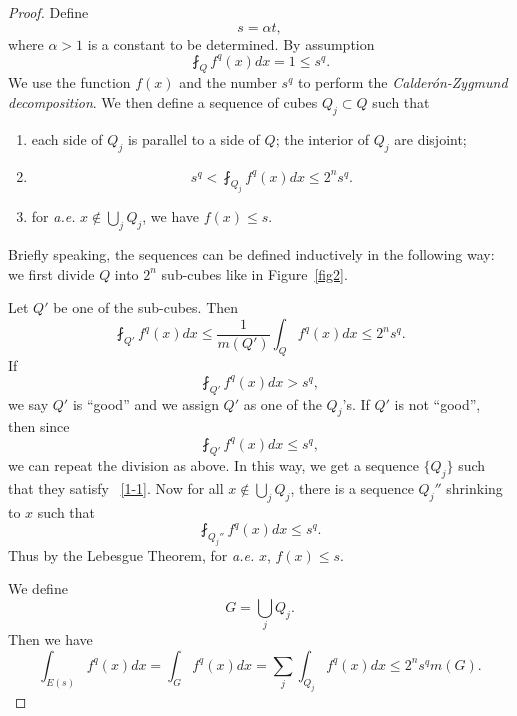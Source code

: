 \begin{proof}
Define
\[
s=\alpha t,
\]
where $\alpha>1$ is a constant to be determined. By assumption
\[
\fint_Q f^q(x) dx=1\leq s^q.
\]
We use the function $f(x)$ and the number $s^q$ to perform the \emph{Calder\'on-Zygmund
decomposition}. We then  define  a sequence of cubes $Q_j\subset Q$ such that
\begin{enumerate}
\item each side of $Q_j$ is parallel to a side of $Q$; the interior of $Q_j$ are disjoint;
\item
\begin{equation}\label{1-1}
s^q<\fint_{Q_j} f^q(x) dx\leq 2^n s^q.
\end{equation}
\item for \emph{a.e.} $x\not\in \bigcup_j Q_j$, we have $f(x)\leq s$.
\end{enumerate}
 Briefly speaking, the sequences can be defined inductively in the following way: we first divide $Q$ into $2^n$ sub-cubes like in Figure~\ref{fig2}. 
 
\begin{center}
  \end{center}

 
 Let $Q'$ be one of the sub-cubes. Then
 \[
 \fint_{Q'} f^q(x) dx\leq \frac{1}{m(Q')}\int_Q f^q(x)dx\leq 2^n s^q.
 \]
 If \[
 \fint_{Q'} f^q(x) dx>s^q,
 \]
 we say $Q'$ is ``good'' and we assign $Q'$ as one of the $Q_j$'s. If $Q'$ is not ``good'', then since 
 \[
 \fint_{Q'} f^q(x) dx\leq s^q,
 \]
 we can repeat the division as above. In this way, we get a sequence $\{Q_j\}$ such that they satisfy ~\eqref{1-1}. Now for all $x\not\in \bigcup_j Q_j$, there is a sequence $Q_j''$ shrinking to $x$ such that
 \[
 \fint_{Q_j''} f^q(x)dx\leq s^q.
 \]
 Thus by the Lebesgue Theorem, for \emph{a.e.} $x$, $f(x)\leq s$.
 
 We define 
 \[
 G=\bigcup_jQ_j.
 \]
 Then we have
 \[
 \int_{E(s)} f^q(x) dx=\int_G f^q(x)dx=\sum_j\int_{Q_j} f^q(x) dx\leq 2^n s^q m(G).
 \]
 

\end{proof}
